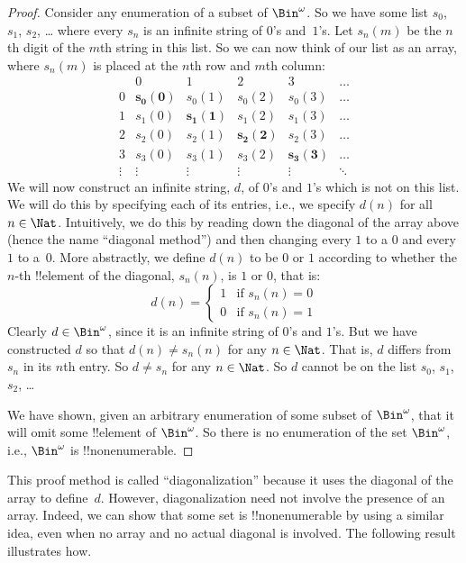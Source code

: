 \documentclass[../../../include/open-logic-section]{subfiles}
\begin{document}
\begin{proof}
Consider any enumeration of a subset of $\Bin^\omega$. So we have some
list $s_{0}$, $s_{1}$, $s_{2}$, \dots{} where every $s_n$ is an
infinite string of $0$'s and~$1$'s. Let $s_n(m)$ be the $n$th digit of
the $m$th string in this list. So we can now think of our list as an
array, where $s_n(m)$ is placed at the $n$th row and $m$th column:
\[
\begin{array}{c|c|c|c|c|c}
& 0 & 1 & 2 & 3 & \dots \\\hline
0 & \mathbf{s_{0}(0)} & s_{0}(1) & s_{0}(2) & s_0(3) & \dots \\\hline
1 & s_{1}(0)& \mathbf{s_{1}(1)} & s_1(2) & s_1(3) & \dots \\\hline
2 & s_{2}(0)& s_{2}(1) & \mathbf{s_2(2)} & s_2(3) & \dots \\\hline
3 & s_{3}(0)& s_{3}(1) & s_3(2) & \mathbf{s_3(3)} & \dots \\\hline
\vdots & \vdots & \vdots & \vdots & \vdots & \mathbf{\ddots}
\end{array}
\]
We will now construct an infinite string, $d$, of $0$'s and $1$'s
which is not on this list.  We will do this by specifying each of its
entries, i.e., we specify $d(n)$ for all $n \in \Nat$.  Intuitively,
we do this by reading down the diagonal of the array above (hence the
name ``diagonal method'') and then changing every $1$ to a $0$ and
every $1$ to a~$0$. More abstractly, we define $d(n)$ to be $0$ or $1$
according to whether the $n$-th !!{element} of the diagonal, $s_n(n)$,
is $1$ or $0$, that is:
\[
d(n) =
\begin{cases}
1 & \text{if $s_{n}(n) = 0$}\\
0 & \text{if $s_{n}(n) = 1$}
\end{cases}
\]
Clearly $d \in \Bin^\omega$, since it is an infinite string of $0$'s
and $1$'s. But we have constructed $d$ so that $d(n) \neq s_n(n)$ for
any $n \in \Nat$. That is, $d$ differs from $s_n$ in its $n$th entry.
So $d \neq s_n$ for any $n\in \Nat$. So $d$ cannot be on the list
$s_0$, $s_1$, $s_2$,
\dots

We have shown, given an arbitrary enumeration of some subset of
$\Bin^\omega$, that it will omit some !!{element} of $\Bin^\omega$. So
there is no enumeration of the set $\Bin^\omega$, i.e., $\Bin^\omega$
is !!{nonenumerable}.
\end{proof}

\begin{explain}
This proof method is called ``diagonalization'' because it uses the
diagonal of the array to define~$d$. However, diagonalization need
not involve the presence of an array. Indeed, we can show that some set is 
!!{nonenumerable} by using a similar idea, even when no array and no
actual diagonal is involved. The following result illustrates how.
\end{explain}
\end{document}
